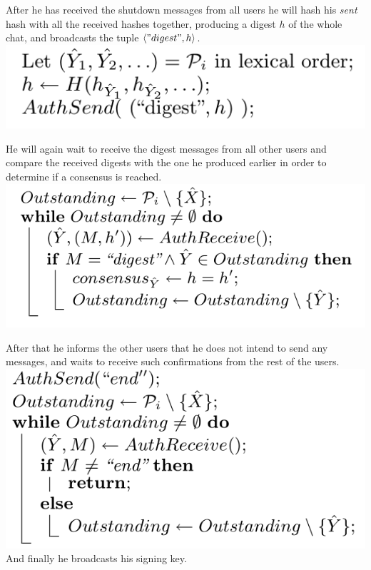 \begin{frame}
After he has received the shutdown messages from all users he will hash his \emph{sent} hash with all the received hashes together, producing a digest $h$ of the whole chat, and broadcasts the tuple $\langle "digest", h \rangle$.\\[0.5cm]

\includegraphics[scale=0.4]{Figures/chat_digest.png}
\end{frame}

\begin{frame}
He will again wait to receive the digest messages from all other users and compare the received digests with the one he produced earlier in order to determine if a consensus is reached.\\[0.5cm]

\includegraphics[scale=0.4]{Figures/determine_consensus.png}
\end{frame}

\begin{frame}
After that he informs the other users that he does not intend to send any messages, and waits to receive such confirmations from the rest of the users.\\[0.5cm]

\includegraphics[scale=0.4]{Figures/no_listen_verify.png}\\[1cm]

And finally he broadcasts his signing key.
\end{frame}
